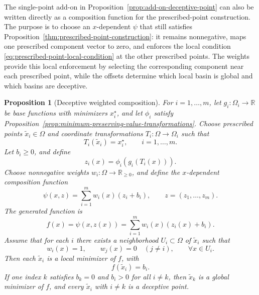 \documentclass[journal]{IEEEtran}
\theoremstyle{remark}
\theoremstyle{plain}
\newtheorem{proposition}{Proposition}
\begin{document}
The single-point add-on in
Proposition~\ref{prop:add-on-deceptive-point} can also be written directly as a
composition function for the prescribed-point construction. The purpose is to
choose an \(x\)-dependent \(\psi\) that still satisfies
Proposition~\ref{thm:prescribed-point-construction}: it remains nonnegative,
maps one prescribed component vector to zero, and enforces the local condition
\eqref{eq:prescribed-point-local-condition} at the other prescribed points.
The weights provide this local enforcement by selecting the corresponding
component near each prescribed point, while the offsets determine which local
basin is global and which basins are deceptive.

\begin{proposition}[Deceptive weighted composition]
	\label{prop:deceptive-weighted-composition}
	For \(i=1,\ldots,m\), let \(g_i:\Omega_i\to\mathbb{R}\) be base functions
	with minimizers \(x_i^\star\), and let \(\phi_i\) satisfy
	Proposition~\ref{prop:minimum-preserving-value-transformations}.
	Choose prescribed points \(\tilde x_i\in\Omega\) and coordinate
	transformations \(T_i:\Omega\to\Omega_i\) such that
	\[
	T_i(\tilde x_i)=x_i^\star,
	\qquad
	i=1,\ldots,m.
	\]
	Let \(b_i\ge0\), and define
	\[
	z_i(x)=\phi_i(g_i(T_i(x))).
	\]
	Choose nonnegative weights \(w_i:\Omega\to\mathbb{R}_{\ge0}\), and define the
	\(x\)-dependent composition function
	\[
	\psi(x,z)
	=
	\sum_{i=1}^m w_i(x)(z_i+b_i),
	\qquad
	z=(z_1,\ldots,z_m).
	\]
	The generated function is
	\[
	f(x)=\psi(x,z(x))
	=
	\sum_{i=1}^m w_i(x)(z_i(x)+b_i).
	\]
	Assume that for each \(i\) there exists a neighborhood \(U_i\subset\Omega\)
	of \(\tilde x_i\) such that
	\[
	w_i(x)=1,
	\qquad
	w_j(x)=0\quad (j\ne i),
	\qquad
	\forall x\in U_i.
	\]
	Then each \(\tilde x_i\) is a local minimizer of \(f\), with
	\[
	f(\tilde x_i)=b_i.
	\]
	If one index \(k\) satisfies \(b_k=0\) and \(b_i>0\) for all \(i\ne k\), then
	\(\tilde x_k\) is a global minimizer of \(f\), and every \(\tilde x_i\) with
	\(i\ne k\) is a deceptive point. 
\end{proposition}
\end{document}
